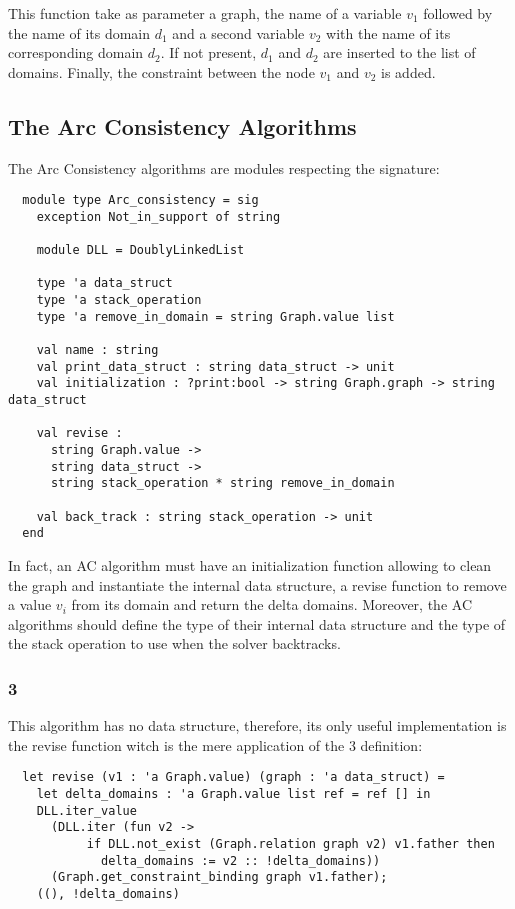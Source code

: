 \documentclass{rapport}
\begin{document}
This function take as parameter a graph, the name of a variable $v_1$ followed by the name of its domain $d_1$ and a second variable $v_2$ with the name of its corresponding domain $d_2$. If not present, $d_1$ and $d_2$ are inserted to the list of domains. Finally, the constraint between the node $v_1$ and $v_2$ is added.


\subsection{The Arc Consistency Algorithms}
The Arc Consistency algorithms are modules respecting the signature:

\begin{verbatim}
  module type Arc_consistency = sig
    exception Not_in_support of string

    module DLL = DoublyLinkedList

    type 'a data_struct
    type 'a stack_operation
    type 'a remove_in_domain = string Graph.value list

    val name : string
    val print_data_struct : string data_struct -> unit
    val initialization : ?print:bool -> string Graph.graph -> string data_struct

    val revise :
      string Graph.value ->
      string data_struct ->
      string stack_operation * string remove_in_domain

    val back_track : string stack_operation -> unit
  end
\end{verbatim}

In fact, an AC algorithm must have an initialization function allowing to clean the graph and instantiate the internal data structure, a revise function to remove a value $v_i$ from its domain and return the delta domains. Moreover, the AC algorithms should define the type of their internal data structure and the type of the stack operation to use when the solver backtracks.

\subsubsection{\ac{3}}

This algorithm has no data structure, therefore, its only useful implementation is the revise function witch is the mere application of the \ac{3} definition:

\begin{verbatim}
  let revise (v1 : 'a Graph.value) (graph : 'a data_struct) =
    let delta_domains : 'a Graph.value list ref = ref [] in
    DLL.iter_value
      (DLL.iter (fun v2 ->
           if DLL.not_exist (Graph.relation graph v2) v1.father then
             delta_domains := v2 :: !delta_domains))
      (Graph.get_constraint_binding graph v1.father);
    ((), !delta_domains)
\end{verbatim}
\end{document}
